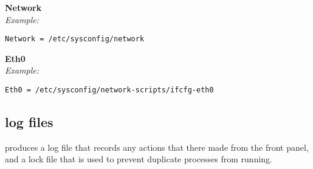 {\bfseries Network}\\
\textit{Example:}
\begin{lstlisting}
Network = /etc/sysconfig/network
\end{lstlisting}

{\bfseries Eth0}\\
\textit{Example:}
\begin{lstlisting}
Eth0 = /etc/sysconfig/network-scripts/ifcfg-eth0
\end{lstlisting}

\subsection{log files}
 produces a log file  that records any
actions that there made from the front panel, and a lock file 
that is used to prevent duplicate processes from running.